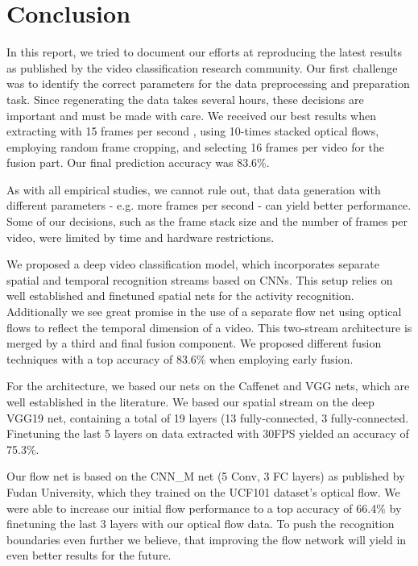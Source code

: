 \section{Conclusion}
\label{sec:conclusion}

In this report, we tried to document our efforts at reproducing the latest results as published by the video classification research community.
Our first challenge was to identify the correct parameters for the data preprocessing and preparation task.
Since regenerating the data takes several hours, these decisions are important and must be made with care.
We received our best results when extracting with 15 frames per second , using 10-times stacked optical flows, employing random frame cropping, and selecting 16 frames per video for the fusion part.
Our final prediction accuracy was 83.6\%.

As with all empirical studies, we cannot rule out, that data generation with different parameters - e.g. more frames per second - can yield better performance.
Some of our decisions, such as the frame stack size and the number of frames per video, were limited by time and hardware restrictions.

We proposed a deep video classification model, which incorporates separate spatial and temporal recognition streams based on CNNs. This setup relies on well established and finetuned spatial nets for the activity recognition. Additionally we see great promise in the use of a separate flow net using optical flows to reflect the temporal dimension of a video. This two-stream architecture is merged by a third and final fusion component. We proposed different fusion techniques with a top accuracy of 83.6\% when employing early fusion.

For the architecture, we based our nets on the Caffenet and VGG nets, which are well established in the literature.
We based our spatial stream on the deep VGG19 net, containing a total of 19 layers (13 fully-connected, 3 fully-connected. Finetuning the last 5 layers on data extracted with 30FPS yielded an accuracy of 75.3\%.

Our flow net is based on the CNN_M net (5 Conv, 3 FC layers) as published by Fudan University, which they trained on the UCF101 dataset's optical flow.  We were able to increase our initial flow performance to a top accuracy of 66.4\% by finetuning the last 3 layers with our optical flow data. To push the recognition boundaries even further we believe, that improving the flow network will yield in even better results for the future.

